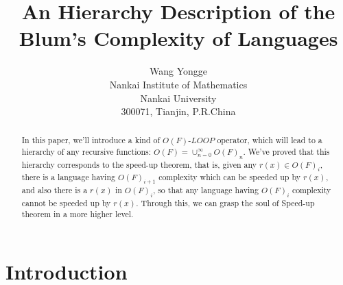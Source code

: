 \setlength{\textheight}{8.8in}
\setlength{\columnsep}{2.0pc}
\setlength{\textwidth}{6.8in}
\setlength{\footheight}{0.0in}
\setlength{\topmargin}{0.25in}
\setlength{\headheight}{0.0in}
\setlength{\headsep}{0.0in}
\setlength{\oddsidemargin}{-.19in}
\setlength{\parindent}{1pc}

\title{An Hierarchy Description of the Blum's Complexity
of Languages}
\author{Wang Yongge\\
Nankai Institute of Mathematics\\
Nankai University\\
300071, Tianjin, P.R.China
}
\date{ }

\date{}
\maketitle
\begin{abstract}
In this paper, we'll introduce a kind 
of $O(F)$-$LOOP$ operator,
which will lead to a hierarchy of any recursive functions:
$O(F)=\cup^\infty_{n=0}O(F)_n$. We've proved that this
hierarchy corresponds to the speed-up theorem, 
that is, given any 
$r(x)\in O(F)_i$, there is a language having $O(F)_{i+1}$ 
complexity which can be speeded up by $r(x)$, 
and also there is a
$r(x)$ in $O(F)_i$, so that any language having $O(F)_i$
complexity cannot be speeded up by $r(x)$. 
Through this, we can
grasp the soul of Speed-up theorem in a more higher level.
\end{abstract}

\section{Introduction}

